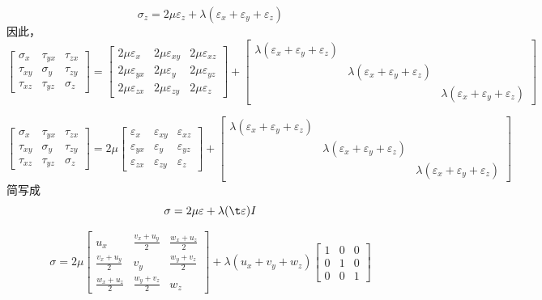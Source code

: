\documentclass[12pt,a4paper]{article}
\begin{document}
$$
\sigma_z=2\mu\varepsilon_z+\lambda(\varepsilon_x+\varepsilon_y+\varepsilon_z)
$$
因此，
$$
\begin{bmatrix}
\sigma _x & \tau_{yx} & \tau_{zx} \\
\tau_{xy} & \sigma _y & \tau_{zy} \\
\tau_{xz} & \tau_{yz} & \sigma _z
\end{bmatrix}=
\begin{bmatrix}
2\mu\varepsilon_x & 2\mu\varepsilon_{xy} & 2\mu\varepsilon_{xz} \\
2\mu\varepsilon_{yx} & 2\mu\varepsilon_{y} & 2\mu\varepsilon_{yz} \\
2\mu\varepsilon_{zx} & 2\mu\varepsilon_{zy} & 2\mu\varepsilon_{z}
\end{bmatrix}+\begin{bmatrix}
\lambda(\varepsilon_x+\varepsilon_y+\varepsilon_z) &  &  \\
 & \lambda(\varepsilon_x+\varepsilon_y+\varepsilon_z) &  \\
 &  & \lambda(\varepsilon_x+\varepsilon_y+\varepsilon_z)
\end{bmatrix}
$$

$$
\begin{bmatrix}
\sigma _x & \tau_{yx} & \tau_{zx} \\
\tau_{xy} & \sigma _y & \tau_{zy} \\
\tau_{xz} & \tau_{yz} & \sigma _z
\end{bmatrix}=
2\mu\begin{bmatrix}
\varepsilon_x & \varepsilon_{xy} & \varepsilon_{xz} \\
\varepsilon_{yx} & \varepsilon_{y} & \varepsilon_{yz} \\
\varepsilon_{zx} & \varepsilon_{zy} & \varepsilon_{z}
\end{bmatrix}+\begin{bmatrix}
\lambda(\varepsilon_x+\varepsilon_y+\varepsilon_z) &  &  \\
 & \lambda(\varepsilon_x+\varepsilon_y+\varepsilon_z) &  \\
 &  & \lambda(\varepsilon_x+\varepsilon_y+\varepsilon_z)
\end{bmatrix}
$$
简写成
$$
\sigma = 2\mu \varepsilon + \lambda(\t \varepsilon) I
$$

$$
\sigma =
2
\mu
\begin{bmatrix}
u_x & \frac{v_x + u_y}{2} & \frac{w_x + u_z}{2} \\
\frac{v_x + u_y}{2} & v_y & \frac{w_y + v_z}{2} \\
\frac{w_x + u_z}{2} & \frac{w_y + v_z}{2} & w_z 
\end{bmatrix}
+ 
\lambda (u_x + v_y + w_z)
\begin{bmatrix}
1 & 0 & 0 \\
0 & 1 & 0 \\
0 & 0 & 1 
\end{bmatrix}
$$
\end{document}
